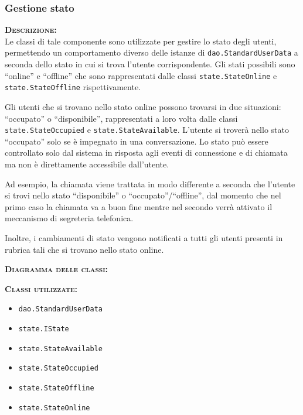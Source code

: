 \subsubsection{Gestione stato}
\begin{description}
	\item{\scshape\bfseries Descrizione:}\\
Le classi di tale componente sono utilizzate per gestire lo stato degli utenti, permettendo un comportamento diverso delle istanze di \texttt{dao.StandardUserData} a seconda dello stato in cui si trova l'utente corrispondente. Gli stati possibili sono ``online'' e ``offline'' che sono rappresentati dalle classi \texttt{state.StateOnline} e \texttt{state.StateOffline} rispettivamente.
	
Gli utenti che si trovano nello stato online possono trovarsi in due situazioni: ``occupato'' o ``disponibile'', rappresentati a loro volta dalle classi \texttt{state.StateOccupied} e \texttt{state.StateAvailable}. L'utente si troverà nello stato ``occupato'' solo se è impegnato in una conversazione. Lo stato può essere controllato solo dal sistema in risposta agli eventi di connessione e di chiamata ma non è direttamente accessibile dall'utente.
	
Ad esempio, la chiamata viene trattata in modo differente a seconda che l'utente si trovi nello stato ``disponibile'' o ``occupato''/``offline'', dal momento che nel primo caso la chiamata va a buon fine mentre nel secondo verrà attivato il meccanismo di segreteria telefonica.
	
Inoltre, i cambiamenti di stato vengono notificati a tutti gli utenti presenti in rubrica tali che si trovano nello stato online.
	\item{\scshape\bfseries Diagramma delle classi:}
	\item{\scshape\bfseries Classi utilizzate:}\\ 
	\begin{itemize}
          \item \texttt{dao.StandardUserData}
          \item \texttt{state.IState}
          \item \texttt{state.StateAvailable}
          \item \texttt{state.StateOccupied}
          \item \texttt{state.StateOffline}
          \item \texttt{state.StateOnline}
	\end{itemize}
\end{description}

